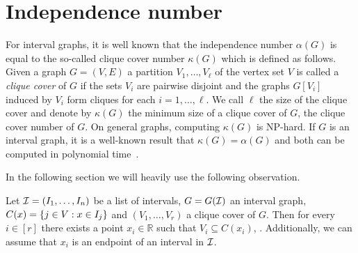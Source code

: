 \section{Independence number}


For interval graphs, it is well known that the independence number $\alpha(G)$ is 
equal to the so-called clique cover number $\kappa(G)$ which is defined as follows.
Given a graph $G=(V,E)$ a partition $V_1, \dots, V_\ell$ of the vertex set $V$ is called a 
\emph{clique cover} of $G$ if the sets $V_i$ are pairwise disjoint and the graphs $G[V_i]$ induced by $V_i$
form cliques for each $i=1,\dots,\ell$. We call $\ell$ the size of the clique cover 
and denote by $\kappa(G)$ the minimum size of a clique cover of $G$, the clique cover number of $G$.
On general graphs, computing $\kappa(G)$ is NP-hard.
If $G$ is an interval graph, it is a well-known result that $\kappa(G) = \alpha(G)$ and both 
can be computed in polynomial time~\cite{golumbic2004algorithmic}.

In the following section we will heavily use the following observation.

\begin{proposition}\label{prop:cliquecover}
    Let $\mathcal{I} = (I_1, \dots, I_n)$ be a list of intervals, $G = G(\mathcal{I})$ an interval graph,
     $C(x) = \{j \in V : x \in I_{j}\}$ and $(V_1, \dots, V_{r})$ a clique cover of $G$.
    Then for every $i \in [r]$ there exists a point $x_{i} \in \mathbb{R}$
    such that $V_{i} \subseteq C(x_i)$, .
     Additionally, we can assume that $x_i$ is an endpoint of an interval in $\mathcal{I}$.
\end{proposition}

